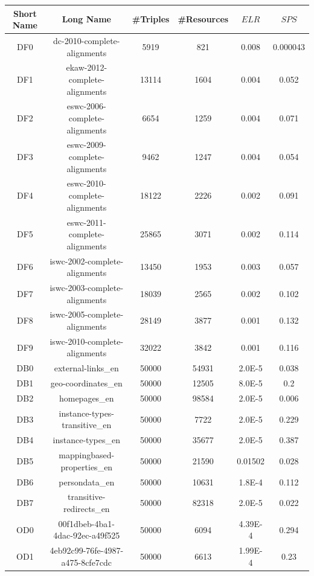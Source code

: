 \FloatBarrier
\begin{center}
	\begin{tabular}{|c|c|c|c|c|c|}
		\hline 
		Short Name & Long Name & \#Triples & \#Resources & $ELR$ & $SPS$ \\ 
		\hline
		DF0 & dc-2010-complete-alignments & 5919 & 821 & 0.008 & 0.000043 \\
		\hline
		DF1 & ekaw-2012-complete-alignments & 13114 & 1604 & 0.004 & 0.052 \\
		\hline
		DF2 & eswc-2006-complete-alignments & 6654 & 1259 & 0.004 & 0.071 \\
		\hline
		DF3 & eswc-2009-complete-alignments & 9462 & 1247 & 0.004 & 0.054 \\
		\hline
		DF4 & eswc-2010-complete-alignments & 18122 & 2226 & 0.002 & 0.091 \\
		\hline
		DF5 & eswc-2011-complete-alignments & 25865 & 3071 & 0.002 & 0.114 \\
		\hline
		DF6 & iswc-2002-complete-alignments & 13450 & 1953 & 0.003 & 0.057 \\
		\hline
		DF7 & iswc-2003-complete-alignments & 18039 & 2565 & 0.002 & 0.102 \\
		\hline
		DF8 & iswc-2005-complete-alignments & 28149 & 3877 & 0.001 & 0.132 \\
		\hline
		DF9 & iswc-2010-complete-alignments & 32022 & 3842 & 0.001 & 0.116 \\
		\hline 
		\hline
		DB0 & external-links\_en & 50000 & 54931 & 2.0E-5 & 0.038 \\
		\hline
		DB1 & geo-coordinates\_en & 50000 & 12505 & 8.0E-5 & 0.2 \\
		\hline
		DB2 & homepages\_en & 50000 & 98584 & 2.0E-5 & 0.006 \\
		\hline
		DB3 & instance-types-transitive\_en & 50000 & 7722 & 2.0E-5 & 0.229 \\
		\hline
		DB4 & instance-types\_en & 50000 & 35677 & 2.0E-5 & 0.387 \\
		\hline
		DB5 & mappingbased-properties\_en & 50000 & 21590 & 0.01502 & 0.028 \\
		\hline
		DB6 & persondata\_en & 50000 & 10631 & 1.8E-4 & 0.112 \\
		\hline
		DB7 & transitive-redirects\_en & 50000 & 82318 & 2.0E-5 & 0.022 \\
		\hline
		\hline
		OD0 & 00f1dbeb-4ba1-4dac-92ec-a49f525 & 50000 & 6094 & 4.39E-4 & 0.294 \\
		\hline
		OD1 & 4eb92c99-76fe-4987-a475-8cfe7cdc & 50000 & 6613 & 1.99E-4 & 0.23 \\

\end{tabular}
\end{center}
